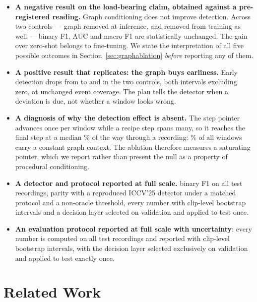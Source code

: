 \documentclass[10pt,twocolumn]{article}
\begin{document}
\begin{itemize}\itemsep2pt
\item \textbf{A negative result on the load-bearing claim, obtained against a
      pre-registered reading.} Graph conditioning does not improve detection.
      Across two controls --- graph removed at inference, and removed from
      training as well --- binary F1, AUC and macro-F1 are statistically
      unchanged. The \resDelta{} gain over zero-shot belongs to fine-tuning. We
      state the interpretation of all five possible outcomes in
      Section~\ref{sec:graphablation} \emph{before} reporting any of them.
\item \textbf{A positive result that replicates: the graph buys earliness.}
      Early detection drops from \resEDS{} to \ngEDS{} and \ntEDS{} in the two
      controls, both intervals excluding zero, at unchanged event coverage. The
      plan tells the detector when a deviation is due, not whether a window
      looks wrong.
\item \textbf{A diagnosis of why the detection effect is absent.} The step
      pointer advances once per window while a recipe step spans many, so it
      reaches the final step at a median \satReach{}\% of the way through a
      recording: \satPct{}\% of all windows carry a constant graph context. The
      ablation therefore measures a saturating pointer, which we report rather
      than present the null as a property of procedural conditioning.
\item \textbf{A detector and protocol reported at full scale.} \resF{} binary F1
      on all \resClips{} test recordings, parity with a reproduced ICCV'25
      detector \citep{patsch2025mistsense} under a matched protocol and a
      non-oracle threshold, every number with clip-level bootstrap intervals and
      a decision layer selected on validation and applied to test once.
\item \textbf{An evaluation protocol reported at full scale with uncertainty}:
      every number is computed on all \resClips{} test recordings and reported
      with clip-level bootstrap intervals, with the decision layer selected
      exclusively on validation and applied to test exactly once.
\end{itemize}

\section{Related Work}
\label{sec:related}
\end{document}
